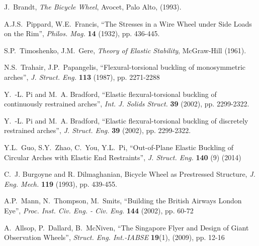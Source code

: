 \documentclass{bmd2016p}
\begin{document}
% 
% 
\begin{thebibliography}{6}
 J.~Brandt, 
\textit{The Bicycle Wheel},
Avocet, Palo Alto, (1993).

 A.J.S.~Pippard, W.E.~Francis, 
``The Stresses in a Wire Wheel under Side Loads on the Rim'',
\textit{Philos. Mag.} \textbf{14} (1932), pp. 436-445.

 S.P.~Timoshenko, J.M.~Gere, 
\textit{Theory of Elastic Stability}, 
McGraw-Hill (1961).

 N.S.~Trahair, J.P.~Papangelis, 
``Flexural-torsional buckling of monosymmetric arches'', 
\textit{J. Struct. Eng.} \textbf{113} (1987), pp. 2271-2288

 Y.~-L. Pi and M.~A. Bradford, 
``Elastic flexural-torsional buckling of continuously restrained arches'',
\textit{Int. J. Solids Struct.} \textbf{39} (2002), pp. 2299-2322.

 Y.~-L. Pi and M.~A. Bradford, 
``Elastic flexural-torsional buckling of discretely restrained arches'',
\textit{J. Struct. Eng.} \textbf{39} (2002), pp. 2299-2322.

 Y.L.~Guo, S.Y.~Zhao, C.~You, Y.L.~Pi, 
``Out-of-Plane Elastic Buckling of Circular Arches with Elastic End Restraints'', 
\textit{J. Struct. Eng.} \textbf{140} (9) (2014)

 C.~J. Burgoyne and R. Dilmaghanian,
Bicycle Wheel as Prestressed Structure, 
\textit{J. Eng. Mech.} \textbf{119} (1993), pp. 439-455.

 A.P.~Mann, N.~Thompson, M.~Smits, 
``Building the British Airways London Eye'', 
\textit{Proc. Inst. Civ. Eng. - Civ. Eng.} \textbf{144} (2002), pp. 60-72

 A.~Allsop, P.~Dallard, B.~McNiven, 
``The Singapore Flyer and Design of Giant Observation Wheels'', 
\textit{Struct. Eng. Int.-IABSE} \textbf{19}(1), (2009), pp. 12-16

\end{thebibliography}
\end{document}
